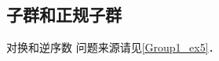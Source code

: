 
\subsection{子群和正规子群}

\begin{example}{对换和逆序数}\label{GroupP_ex1}
问题来源请见\autoref{Group1_ex5}．



\end{example}